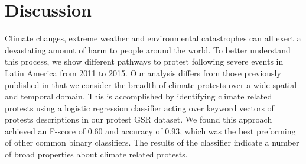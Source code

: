 \documentclass[9pt,twocolumn,twoside]{pnas-new}
\begin{document}
%
%



\section*{Discussion}
Climate changes, extreme weather and environmental catastrophes can all exert a devastating amount of harm to people around the world.
To better understand this process, we show different pathways to protest following severe events in Latin America from 2011 to 2015.
Our analysis differs from those previously published in that we consider the breadth of climate protests over a wide spatial and temporal domain.
This is accomplished by identifying climate related protests using a logistic regression classifier acting over keyword vectors of protests descriptions in our protest GSR dataset.
We found this approach achieved an F-score of 0.60 and accuracy of 0.93, which was the best preforming of other common binary classifiers.
The results of the classifier indicate a number of broad properties about climate related protests.
\end{document}
